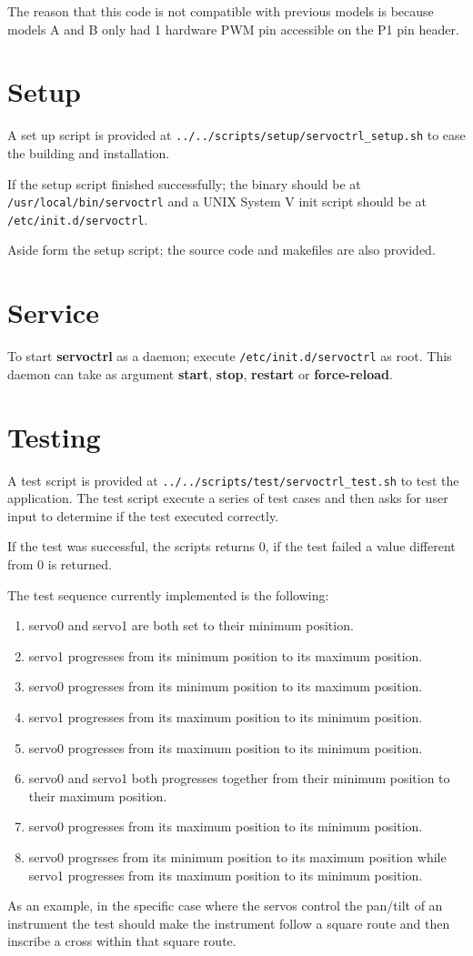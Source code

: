 The reason that this code is not compatible with previous models is because
models A and B only had 1 hardware PWM pin accessible on the P1 pin header.

\section{Setup}
A set up script is provided at \texttt{../../scripts/setup/servoctrl\_setup.sh}
to ease the building and installation.

If the setup script finished successfully; the binary should be at\\
\texttt{/usr/local/bin/servoctrl} and a UNIX System V init script should be at\\
\texttt{/etc/init.d/servoctrl}.

Aside form the setup script; the source code and makefiles are also provided.

\section{Service} \label{sec:service}
To start \textbf{servoctrl} as a daemon; execute \texttt{/etc/init.d/servoctrl}
as root. This daemon can take as argument \textbf{start}, \textbf{stop},
\textbf{restart} or \textbf{force-reload}.

\section{Testing}
A test script is provided at \texttt{../../scripts/test/servoctrl\_test.sh} to
test the application. The test script execute a series of test cases and then
asks for user input to determine if the test executed correctly.

If the test was successful, the scripts returns 0, if the test failed a value
different from 0 is returned.

The test sequence currently implemented is the following:

   \begin{enumerate}
      \item servo0 and servo1 are both set to their minimum position.
      \item servo1 progresses from its minimum position to its maximum position.
      \item servo0 progresses from its minimum position to its maximum position.
      \item servo1 progresses from its maximum position to its minimum position.
      \item servo0 progresses from its maximum position to its minimum position.
      \item servo0 and servo1 both progresses together from their minimum
         position to their maximum position.
      \item servo0 progresses from its maximum position to its minimum position.
      \item servo0 progrsses from its minimum position to its maximum position
         while servo1 progresses from its maximum position to its minimum
         position.
   \end{enumerate}

As an example, in the specific case where the servos control the pan/tilt of an
instrument the test should make the instrument follow a square route and then
inscribe a cross within that square route.
